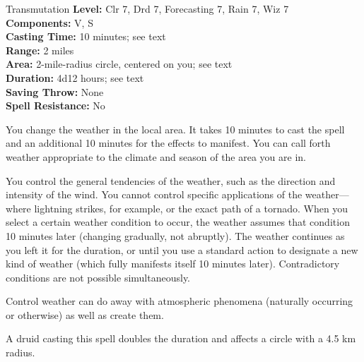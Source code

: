 {Transmutation}
{
	\textbf{Level:}
	Clr 7, Drd 7, Forecasting 7, Rain 7, Wiz 7\\
	\textbf{Components:}
	V, S\\
	\textbf{Casting Time:}
	10 minutes; see text\\
	\textbf{Range:}
	2 miles\\
	\textbf{Area:}
	2-mile-radius circle, centered on you; see text\\
	\textbf{Duration:}
	4d12 hours; see text\\
	\textbf{Saving Throw:}
	None\\
	\textbf{Spell Resistance:}
	No\\
}
{

	You change the weather in the local area. It takes 10 minutes to cast the spell and an additional 10 minutes for the effects to manifest. You can call forth weather appropriate to the climate and season of the area you are in.

	You control the general tendencies of the weather, such as the direction and intensity of the wind. You cannot control specific applications of the weather---where lightning strikes, for example, or the exact path of a tornado. When you select a certain weather condition to occur, the weather assumes that condition 10 minutes later (changing gradually, not abruptly). The weather continues as you left it for the duration, or until you use a standard action to designate a new kind of weather (which fully manifests itself 10 minutes later). Contradictory conditions are not possible simultaneously.

	Control weather can do away with atmospheric phenomena (naturally occurring or otherwise) as well as create them.

	A druid casting this spell doubles the duration and affects a circle with a 4.5 km radius.

}
